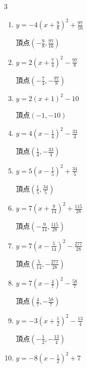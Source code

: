 \begin{multicols}{3}
\begin{enumerate}
  \item $\displaystyle y=-4\left( x+\frac{9}{8}\right)^{2}+\frac{97}{16}$

        $\displaystyle 頂点\left( -\frac{9}{8} , \frac{97}{16} \right)$

  \item $\displaystyle y=2\left( x+\frac{7}{4}\right)^{2}-\frac{97}{8}$

        $\displaystyle 頂点\left( -\frac{7}{4} , -\frac{97}{8} \right)$

  \item $\displaystyle y=2\left( x+1\right)^{2}-10$

        $\displaystyle 頂点\left( -1 , -10 \right)$

  \item $\displaystyle y=4\left( x-\frac{1}{4}\right)^{2}-\frac{33}{4}$

        $\displaystyle 頂点\left( \frac{1}{4} , -\frac{33}{4} \right)$

  \item $\displaystyle y=5\left( x-\frac{1}{5}\right)^{2}+\frac{34}{5}$

        $\displaystyle 頂点\left( \frac{1}{5} , \frac{34}{5} \right)$

  \item $\displaystyle y=7\left( x+\frac{9}{14}\right)^{2}+\frac{115}{28}$

        $\displaystyle 頂点\left( -\frac{9}{14} , \frac{115}{28} \right)$

  \item $\displaystyle y=7\left( x-\frac{5}{14}\right)^{2}-\frac{277}{28}$

        $\displaystyle 頂点\left( \frac{5}{14} , -\frac{277}{28} \right)$

  \item $\displaystyle y=7\left( x-\frac{4}{7}\right)^{2}-\frac{58}{7}$

        $\displaystyle 頂点\left( \frac{4}{7} , -\frac{58}{7} \right)$

\columnbreak %

\resetques

  \item $\displaystyle y=-3\left( x+\frac{1}{2}\right)^{2}-\frac{13}{4}$

        $\displaystyle 頂点\left( -\frac{1}{2} , -\frac{13}{4} \right)$

  \item $\displaystyle y=-8\left( x-\frac{1}{2}\right)^{2}+7$


\end{enumerate}
\end{multicols}
